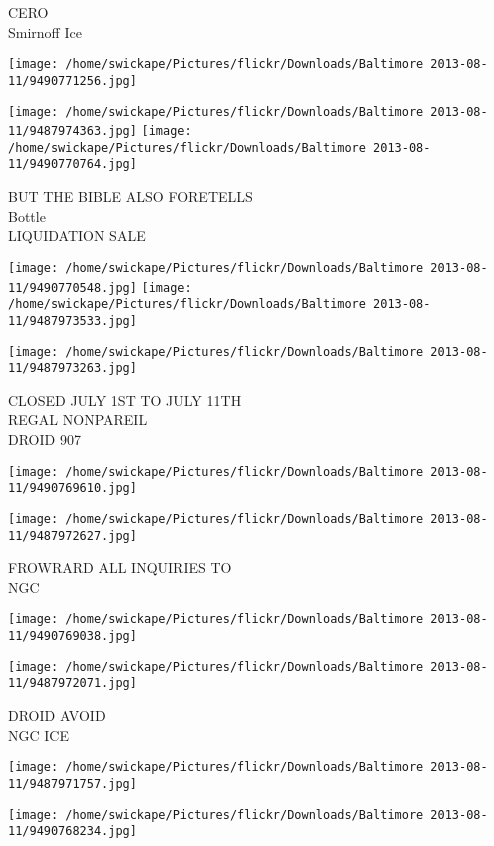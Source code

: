 \documentclass[10pt,letterpaper]{article}
\begin{document}
CERO\\
Smirnoff Ice
\pagebreak

\texttt{[image: /home/swickape/Pictures/flickr/Downloads/Baltimore 2013-08-11/9490771256.jpg]}

\vspace{0.25in}
\texttt{[image: /home/swickape/Pictures/flickr/Downloads/Baltimore 2013-08-11/9487974363.jpg]}
\texttt{[image: /home/swickape/Pictures/flickr/Downloads/Baltimore 2013-08-11/9490770764.jpg]}

BUT THE BIBLE ALSO FORETELLS\\
Bottle\\
LIQUIDATION SALE
\pagebreak

\texttt{[image: /home/swickape/Pictures/flickr/Downloads/Baltimore 2013-08-11/9490770548.jpg]}
\texttt{[image: /home/swickape/Pictures/flickr/Downloads/Baltimore 2013-08-11/9487973533.jpg]}

\vspace{0.25in}
\texttt{[image: /home/swickape/Pictures/flickr/Downloads/Baltimore 2013-08-11/9487973263.jpg]}

CLOSED JULY 1ST TO JULY 11TH\\
REGAL NONPAREIL\\
DROID 907
\pagebreak

\texttt{[image: /home/swickape/Pictures/flickr/Downloads/Baltimore 2013-08-11/9490769610.jpg]}

\vspace{0.25in}
\texttt{[image: /home/swickape/Pictures/flickr/Downloads/Baltimore 2013-08-11/9487972627.jpg]}

FROWRARD ALL INQUIRIES TO\\
NGC
\pagebreak

\texttt{[image: /home/swickape/Pictures/flickr/Downloads/Baltimore 2013-08-11/9490769038.jpg]}

\vspace{0.25in}
\texttt{[image: /home/swickape/Pictures/flickr/Downloads/Baltimore 2013-08-11/9487972071.jpg]}

DROID AVOID\\
NGC ICE
\pagebreak

\texttt{[image: /home/swickape/Pictures/flickr/Downloads/Baltimore 2013-08-11/9487971757.jpg]}

\vspace{0.25in}
\texttt{[image: /home/swickape/Pictures/flickr/Downloads/Baltimore 2013-08-11/9490768234.jpg]}
\end{document}
